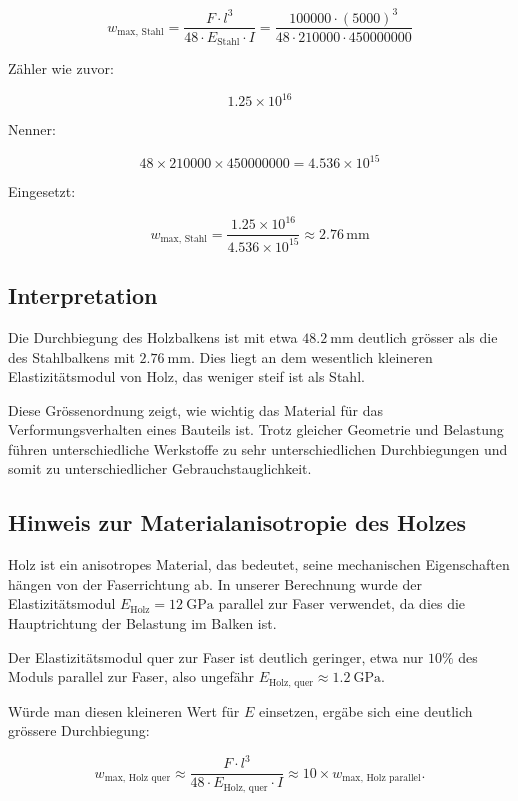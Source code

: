 	\[
	w_{\text{max, Stahl}} = \frac{F \cdot l^3}{48 \cdot E_{\text{Stahl}} \cdot I}
	= \frac{100000 \cdot (5000)^3}{48 \cdot 210000 \cdot 450000000}
	\]
	
	Zähler wie zuvor:
	
	\[
	1.25 \times 10^{16}
	\]
	
	Nenner:
	
	\[
	48 \times 210000 \times 450000000 = 4.536 \times 10^{15}
	\]
	
	Eingesetzt:
	
	\[
	w_{\text{max, Stahl}} = \frac{1.25 \times 10^{16}}{4.536 \times 10^{15}} \approx 2.76\, \mathrm{mm}
	\]
	
	\subsection*{Interpretation}
	
	Die Durchbiegung des Holzbalkens ist mit etwa \(\SI{48.2}{\milli\meter}\) deutlich grösser als die des Stahlbalkens mit \(\SI{2.76}{\milli\meter}\). 
	Dies liegt an dem wesentlich kleineren Elastizitätsmodul von Holz, das weniger steif ist als Stahl.
	
	Diese Grössenordnung zeigt, wie wichtig das Material für das Verformungsverhalten eines Bauteils ist. 
	Trotz gleicher Geometrie und Belastung führen unterschiedliche Werkstoffe zu sehr unterschiedlichen Durchbiegungen und somit zu unterschiedlicher Gebrauchstauglichkeit.
	
	\subsection*{Hinweis zur Materialanisotropie des Holzes}
	
	Holz ist ein anisotropes Material, das bedeutet, seine mechanischen Eigenschaften hängen von der Faserrichtung ab. 
	In unserer Berechnung wurde der Elastizitätsmodul \( E_{\text{Holz}} = \SI{12}{\giga\pascal} \) parallel zur Faser verwendet, da dies die Hauptrichtung der Belastung im Balken ist.
	
	Der Elastizitätsmodul quer zur Faser ist deutlich geringer, etwa nur \(10\%\) des Moduls parallel zur Faser, also ungefähr \( E_{\text{Holz, quer}} \approx \SI{1.2}{\giga\pascal} \).
	
	Würde man diesen kleineren Wert für \( E \) einsetzen, ergäbe sich eine deutlich grössere Durchbiegung:
	
	\[
	w_{\text{max, Holz quer}} \approx \frac{F \cdot l^3}{48 \cdot E_{\text{Holz, quer}} \cdot I} \approx 10 \times w_{\text{max, Holz parallel}}.
	\]
	

